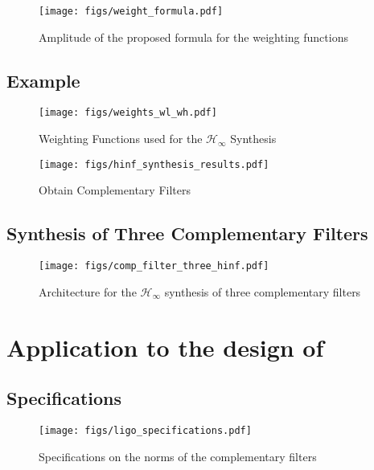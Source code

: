\documentclass[9pt, technote, a4paper]{ieeeconf}
\begin{document}
\begin{figure}[htbp]
\centering
\texttt{[image: figs/weight\_formula.pdf]}
\caption{\label{fig:weight_formula}
Amplitude of the proposed formula for the weighting functions}
\end{figure}

\subsection{Example}
\label{sec:orgf8bbd7b}

\begin{figure}[htbp]
\centering
\texttt{[image: figs/weights\_wl\_wh.pdf]}
\caption{\label{fig:weights_wl_wh}
Weighting Functions used for the \(\mathcal{H}_\infty\) Synthesis}
\end{figure}


\begin{figure}[htbp]
\centering
\texttt{[image: figs/hinf\_synthesis\_results.pdf]}
\caption{\label{fig:hinf_synthesis_results}
Obtain Complementary Filters}
\end{figure}

\subsection{Synthesis of Three Complementary Filters}
\label{sec:org916d6f2}

\begin{figure}[htbp]
\centering
\texttt{[image: figs/comp\_filter\_three\_hinf.pdf]}
\caption{\label{fig:comp_filter_three_hinf}
Architecture for the \(\mathcal{H}_\infty\) synthesis of three complementary filters}
\end{figure}

\section{Application to the design of}
\label{sec:org7e3fe3e}
\label{sec:application}

\subsection{Specifications}
\label{sec:org7f6a128}

\begin{figure}[htbp]
\centering
\texttt{[image: figs/ligo\_specifications.pdf]}
\caption{\label{fig:ligo_specifications}
Specifications on the norms of the complementary filters}
\end{figure}
\end{document}
